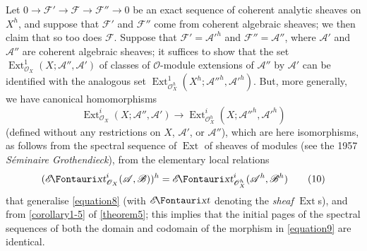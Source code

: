 \documentclass{article}
\theoremstyle{plain}
\theoremstyle{definition}
\newcommand{\sh}{\mathscr}
\newcommand{\shExt}{\sh{E}\textup{\kern-2.2pt{\Fontauri\slshape xt}}}
\newcommand{\Ext}{\operatorname{Ext}}
\begin{document}
Let $0\to\sh{F}'\to\sh{F}\to\sh{F}''\to0$ be an exact sequence of coherent analytic sheaves on $X^h$, and suppose that $\sh{F}'$ and $\sh{F}''$ come from coherent algebraic sheaves;
we then claim that so too does $\sh{F}$.
Suppose that $\sh{F}'=\sh{A}'^h$ and $\sh{F}''=\sh{A}''$, where $\sh{A}'$ and $\sh{A}''$ are coherent algebraic sheaves;
it suffices to show that the set $\Ext_{\sh{O}_X}^1(X;\sh{A}'',\sh{A}')$ of classes of $\sh{O}$-module extensions of $\sh{A}''$ by $\sh{A}'$ can be identified with the analogous set $\Ext_{\sh{O}_X^h}^1(X^h;\sh{A}''^h,\sh{A}'^h)$.
But, more generally, we have canonical homomorphisms
\[
\label{equation9}
  \Ext_{\sh{O}_X}^i(X;\sh{A}'',\sh{A}')
  \to 
  \Ext_{\sh{O}_X^h}^i(X;\sh{A}''^h,\sh{A}'^h)
  \tag{9}
\]
(defined without any restrictions on $X$, $\sh{A}'$, or $\sh{A}''$), which are here isomorphisms, as follows from the spectral sequence of $\Ext$ of sheaves of modules (see the 1957 \emph{S\'{e}minaire Grothendieck}), from the elementary local relations
\[
\label{equation10}
  (\shExt_{\sh{O}_X}^i(\sh{A},\sh{B}))^h
  = \shExt_{\sh{O}_X^h}^i(\sh{A}^h,\sh{B}^h)
  \tag{10}
\]
that generalise \cref{equation8} (with $\shExt$ denoting the \emph{sheaf} $\Ext$s), and from \cref{corollary1-5} of \cref{theorem5};
this implies that the initial pages of the spectral sequences of both the domain and codomain of the morphism in \cref{equation9} are identical.
\end{document}
